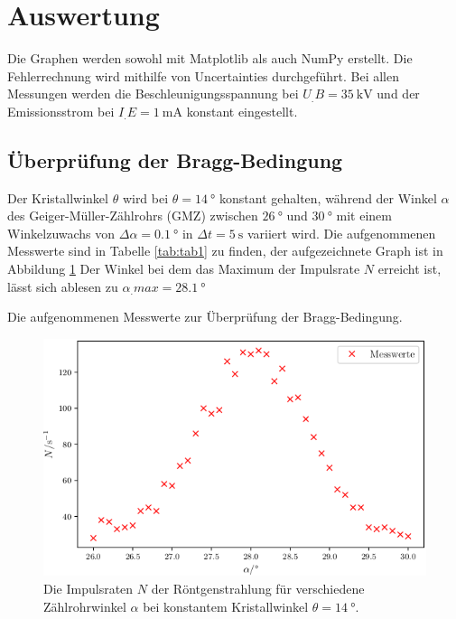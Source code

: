 \section{Auswertung}
\label{sec:Auswertung}


Die Graphen werden sowohl mit Matplotlib \cite{matplotlib} als auch NumPy \cite{numpy} erstellt. Die Fehlerrechnung wird mithilfe von Uncertainties \cite{uncertainties} durchgeführt.\newline
\newline
Bei allen Messungen werden die Beschleunigungsspannung bei $U_.B=\SI{35}{\kilo\volt}$ und der Emissionsstrom bei $I_.E=\SI{1}{\milli\ampere}$ konstant eingestellt.

\subsection{Überprüfung der Bragg-Bedingung}
Der Kristallwinkel $\theta$ wird bei $\theta= \SI{14}{\degree}$ konstant gehalten, während der Winkel $\alpha$ des Geiger-Müller-Zählrohrs (GMZ) zwischen $\SI{26}{\degree}$ und $\SI{30}{\degree}$ mit einem Winkelzuwachs von $\Delta \alpha = \SI{0,1}{\degree}$ in $\Delta t = \SI{5}{\second}$ variiert wird.
Die aufgenommenen Messwerte sind in Tabelle \ref{tab:tab1} zu finden, der aufgezeichnete Graph ist in Abbildung \ref{fig:bragg}
Der Winkel bei dem das Maximum der Impulsrate $N$ erreicht ist, lässt sich ablesen zu $\alpha_.{max}=\SI{28,1}{\degree}$

\begin{table}
\centering
\caption{Die aufgenommenen Messwerte zur Überprüfung der Bragg-Bedingung.}


\label{tab:tab1}
\end{table}

\begin{figure}
\centering
\includegraphics[width=\linewidth-70pt,height=\textheight-70pt,keepaspectratio]{content/images/bragg.png}
\caption{Die Impulsraten $N$ der Röntgenstrahlung für verschiedene Zählrohrwinkel $\alpha$ bei konstantem Kristallwinkel $\theta=\SI{14}{\degree}$.}
\label{fig:bragg}
\end{figure}

